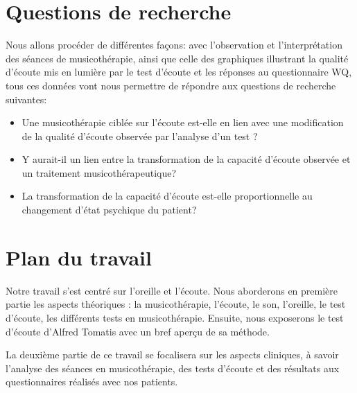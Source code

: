 \section*{Questions de recherche}


Nous allons procéder de différentes façons:  avec l'observation et l'interprétation  des séances de 
musicothérapie, ainsi que celle des graphiques illustrant la qualité d'écoute mis en lumière par le test 
d'écoute
et les réponses au 
questionnaire WQ, tous ces données 
vont nous permettre de 
répondre aux questions de recherche suivantes: 

\begin{itemize}
\item Une musicothérapie ciblée sur l'écoute  est-elle en lien avec une modification de la qualité d'écoute 
observée par  l'analyse d'un test ?
        \item Y aurait-il un lien entre la transformation de la capacité d'écoute observée  et un traitement 
        musicothérapeutique?
  \item La transformation de la capacité d'écoute est-elle  proportionnelle au changement 
  d'état psychique du patient?
   \end{itemize}




\section*{Plan du travail}
Notre travail s'est centré sur l'oreille et l'écoute.
Nous aborderons en première partie les aspects théoriques : la musicothérapie, l'écoute, le son, l'oreille, 
le
test d'écoute, les différents tests en musicothérapie. Ensuite, nous
exposerons le test d'écoute d'Alfred Tomatis avec un bref aperçu de sa méthode.

La deuxième partie de ce travail se focalisera sur les aspects
cliniques, à savoir l'analyse des séances en  musicothérapie,  des tests d'écoute et des résultats aux 
questionnaires  réalisés  avec  nos patients.

